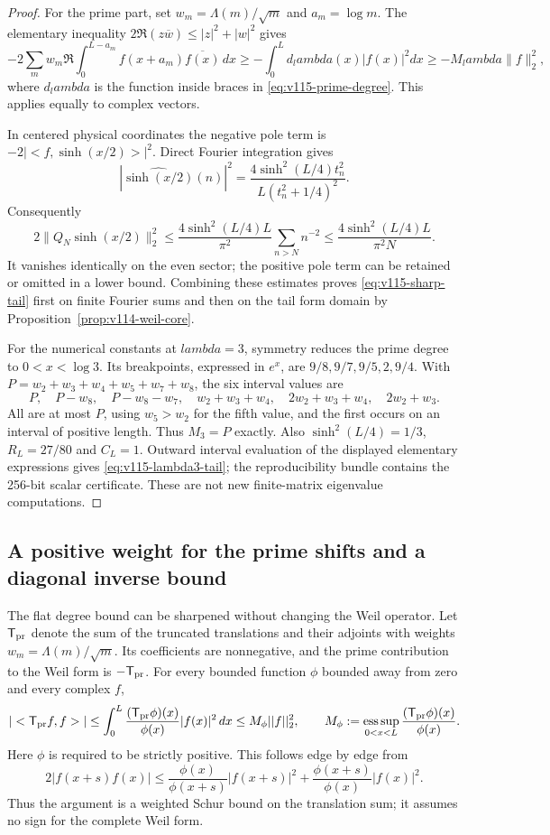 \documentclass[11pt]{article}
\def\lambda{lambda}%
\def\norm#1{||#1||}%
\def\ip#1#2{<#1,#2>}%
\theoremstyle{remark}
\newcommand{\norm}[1]{\left\lVert #1\right\rVert}
\newcommand{\ip}[2]{\left\langle #1,#2\right\rangle}
\begin{document}
\begin{proof}
For the prime part, set $w_m=\Lambda(m)/\sqrt m$ and $a_m=\log m$.
The elementary inequality $2\Re(z\overline w)\le|z|^2+|w|^2$ gives
\[
 -2\sum_m w_m\Re\int_0^{L-a_m}
      f(x+a_m)\overline{f(x)}\,dx
 \ge-\int_0^L d_\lambda(x)|f(x)|^2dx
 \ge-M_\lambda\|f\|_2^2,
\]
where $d_\lambda$ is the function inside braces in
\eqref{eq:v115-prime-degree}. This applies equally to complex vectors.

In centered physical coordinates the negative pole term is
$-2|\ip f{\sinh(x/2)}|^2$. Direct Fourier integration gives
\[
 |\widehat{\sinh(x/2)}(n)|^2
 =\frac{4\sinh^2(L/4)t_n^2}{L(t_n^2+1/4)^2}.
\]
Consequently
\[
 2\|Q_N\sinh(x/2)\|_2^2
 \le\frac{4\sinh^2(L/4)L}{\pi^2}
                         \sum_{n>N}n^{-2}
 \le\frac{4\sinh^2(L/4)L}{\pi^2N}.
\]
It vanishes identically on the even sector; the positive pole term can
be retained or omitted in a lower bound. Combining these estimates
proves \eqref{eq:v115-sharp-tail} first on finite Fourier sums and then
on the tail form domain by Proposition~\ref{prop:v114-weil-core}.

For the numerical constants at $\lambda=3$, symmetry reduces the prime
degree to $0<x<\log3$. Its breakpoints, expressed in $e^x$, are
$9/8,9/7,9/5,2,9/4$. With
$P=w_2+w_3+w_4+w_5+w_7+w_8$, the six interval values are
\[
 P,\quad P-w_8,\quad P-w_8-w_7,\quad
 w_2+w_3+w_4,\quad2w_2+w_3+w_4,\quad2w_2+w_3.
\]
All are at most $P$, using $w_5>w_2$ for the fifth value, and the first
occurs on an interval of positive length. Thus $M_3=P$ exactly.
Also $\sinh^2(L/4)=1/3$, $R_L=27/80$ and $C_L=1$.
Outward interval evaluation of the displayed elementary expressions
gives \eqref{eq:v115-lambda3-tail}; the reproducibility bundle contains
the 256-bit scalar certificate. These are not new finite-matrix
eigenvalue computations.
\end{proof}

\subsection{A positive weight for the prime shifts and a diagonal inverse bound}
The flat degree bound can be sharpened without changing the Weil operator.
Let $\mathsf T_{\rm pr}$ denote the sum of the truncated translations and
their adjoints with weights $w_m=\Lambda(m)/\sqrt m$. Its coefficients
are nonnegative, and the prime contribution to the Weil form is
$-\mathsf T_{\rm pr}$. For every bounded function $\phi$ bounded away
from zero and every complex $f$,
\begin{equation}\label{eq:v116-weighted-prime-general}
 |\ip{\mathsf T_{\rm pr}f}{f}|
 \le\int_0^L\frac{(\mathsf T_{\rm pr}\phi)(x)}{\phi(x)}|f(x)|^2\,dx
 \le M_\phi\norm f_2^2,
 \qquad
 M_\phi:=\mathop{\rm ess\,sup}_{0<x<L}
       \frac{(\mathsf T_{\rm pr}\phi)(x)}{\phi(x)}.
\end{equation}
Here $\phi$ is required to be strictly positive. This follows edge by
edge from
\[
 2|f(x+s)f(x)|\le
 \frac{\phi(x)}{\phi(x+s)}|f(x+s)|^2
 +\frac{\phi(x+s)}{\phi(x)}|f(x)|^2.
\]
Thus the argument is a weighted Schur bound on the translation sum;
it assumes no sign for the complete Weil form.
\end{document}
